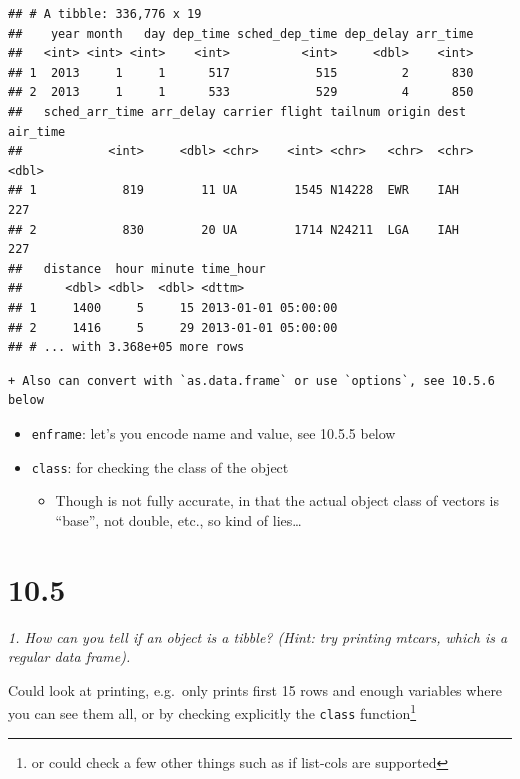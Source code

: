 \documentclass[]{book}
\providecommand{\tightlist}{%
  \setlength{\itemsep}{0pt}\setlength{\parskip}{0pt}}
\let\rmarkdownfootnote\footnote%
\def\footnote{\protect\rmarkdownfootnote}
\theoremstyle{definition}
\theoremstyle{definition}
\theoremstyle{definition}
\theoremstyle{remark}
\begin{document}
\begin{verbatim}
## # A tibble: 336,776 x 19
##    year month   day dep_time sched_dep_time dep_delay arr_time
##   <int> <int> <int>    <int>          <int>     <dbl>    <int>
## 1  2013     1     1      517            515         2      830
## 2  2013     1     1      533            529         4      850
##   sched_arr_time arr_delay carrier flight tailnum origin dest  air_time
##            <int>     <dbl> <chr>    <int> <chr>   <chr>  <chr>    <dbl>
## 1            819        11 UA        1545 N14228  EWR    IAH        227
## 2            830        20 UA        1714 N24211  LGA    IAH        227
##   distance  hour minute time_hour          
##      <dbl> <dbl>  <dbl> <dttm>             
## 1     1400     5     15 2013-01-01 05:00:00
## 2     1416     5     29 2013-01-01 05:00:00
## # ... with 3.368e+05 more rows
\end{verbatim}

\begin{verbatim}
+ Also can convert with `as.data.frame` or use `options`, see 10.5.6 below
\end{verbatim}

\begin{itemize}
\tightlist
\item
  \texttt{enframe}: let's you encode name and value, see 10.5.5 below
\item
  \texttt{class}: for checking the class of the object

  \begin{itemize}
  \tightlist
  \item
    Though is not fully accurate, in that the actual object class of
    vectors is ``base'', not double, etc., so kind of lies\ldots{}
  \end{itemize}
\end{itemize}

\hypertarget{section-28}{%
\section{10.5}\label{section-28}}

\emph{1. How can you tell if an object is a tibble? (Hint: try printing
mtcars, which is a regular data frame).}

Could look at printing, e.g.~only prints first 15 rows and enough
variables where you can see them all, or by checking explicitly the
\texttt{class} function\footnote{or could check a few other things such
  as if list-cols are supported}
\end{document}
